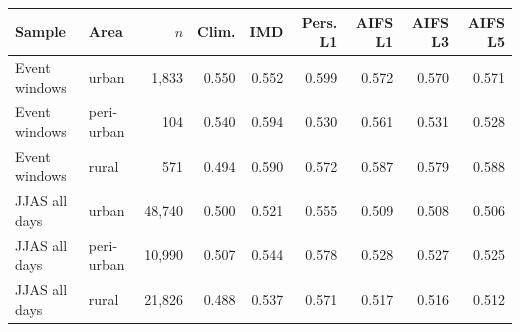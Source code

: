 \begin{tabular}{llrrrrrrr}\toprule Sample & Area & $n$ & Clim. & IMD & Pers. L1 & AIFS L1 & AIFS L3 & AIFS L5 \\ \midrule
Event windows & urban & 1,833 & 0.550 & 0.552 & 0.599 & 0.572 & 0.570 & 0.571 \\
Event windows & peri-urban & 104 & 0.540 & 0.594 & 0.530 & 0.561 & 0.531 & 0.528 \\
Event windows & rural & 571 & 0.494 & 0.590 & 0.572 & 0.587 & 0.579 & 0.588 \\
\midrule
JJAS all days & urban & 48,740 & 0.500 & 0.521 & 0.555 & 0.509 & 0.508 & 0.506 \\
JJAS all days & peri-urban & 10,990 & 0.507 & 0.544 & 0.578 & 0.528 & 0.527 & 0.525 \\
JJAS all days & rural & 21,826 & 0.488 & 0.537 & 0.571 & 0.517 & 0.516 & 0.512 \\
\bottomrule\end{tabular}